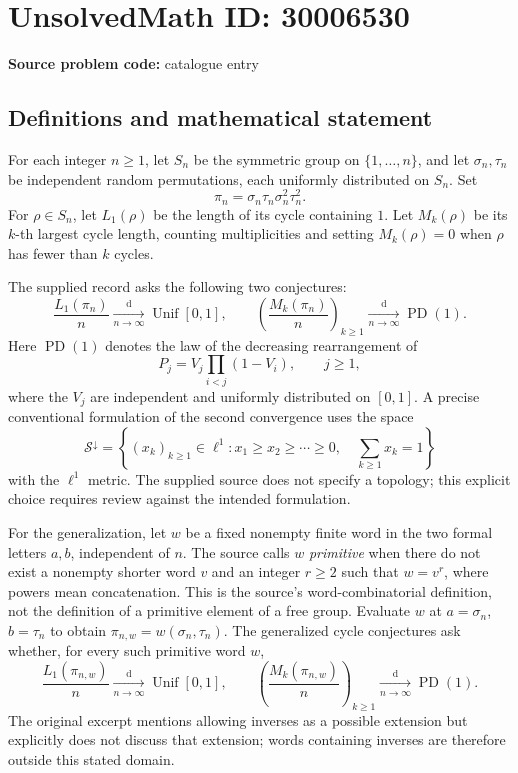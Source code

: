 \documentclass[11pt]{article}
\begin{document}
\section*{UnsolvedMath ID: 30006530}
\textbf{Source problem code:} catalogue entry
\subsection{Definitions and mathematical statement}
For each integer \(n\geq 1\), let \(S_n\) be the symmetric group on \(\{1,\ldots,n\}\), and let \(\sigma_n,\tau_n\) be independent random permutations, each uniformly distributed on \(S_n\). Set
\[
\pi_n=\sigma_n\tau_n\sigma_n^2\tau_n^2.
\]
For \(\rho\in S_n\), let \(L_1(\rho)\) be the length of its cycle containing \(1\). Let \(M_k(\rho)\) be its \(k\)-th largest cycle length, counting multiplicities and setting \(M_k(\rho)=0\) when \(\rho\) has fewer than \(k\) cycles.

The supplied record asks the following two conjectures:
\[
\frac{L_1(\pi_n)}{n}\xrightarrow[n\to\infty]{\mathrm d}\operatorname{Unif}[0,1],
\qquad
\left(\frac{M_k(\pi_n)}{n}\right)_{k\geq1}
\xrightarrow[n\to\infty]{\mathrm d}\operatorname{PD}(1).
\]
Here \(\operatorname{PD}(1)\) denotes the law of the decreasing rearrangement of
\[
P_j=V_j\prod_{i<j}(1-V_i),\qquad j\geq1,
\]
where the \(V_j\) are independent and uniformly distributed on \([0,1]\). A precise conventional formulation of the second convergence uses the space
\[
\mathcal S^{\downarrow}
=\left\{(x_k)_{k\geq1}\in\ell^1:
 x_1\geq x_2\geq\cdots\geq0,\quad \sum_{k\geq1}x_k=1\right\}
\]
with the \(\ell^1\) metric. The supplied source does not specify a topology; this explicit choice requires review against the intended formulation.

For the generalization, let \(w\) be a fixed nonempty finite word in the two formal letters \(a,b\), independent of \(n\). The source calls \(w\) \emph{primitive} when there do not exist a nonempty shorter word \(v\) and an integer \(r\geq2\) such that \(w=v^r\), where powers mean concatenation. This is the source's word-combinatorial definition, not the definition of a primitive element of a free group. Evaluate \(w\) at \(a=\sigma_n\), \(b=\tau_n\) to obtain \(\pi_{n,w}=w(\sigma_n,\tau_n)\). The generalized cycle conjectures ask whether, for every such primitive word \(w\),
\[
\frac{L_1(\pi_{n,w})}{n}\xrightarrow[n\to\infty]{\mathrm d}\operatorname{Unif}[0,1],
\qquad
\left(\frac{M_k(\pi_{n,w})}{n}\right)_{k\geq1}
\xrightarrow[n\to\infty]{\mathrm d}\operatorname{PD}(1).
\]
The original excerpt mentions allowing inverses as a possible extension but explicitly does not discuss that extension; words containing inverses are therefore outside this stated domain.
\end{document}
